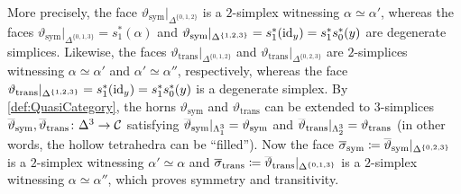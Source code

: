 \begin{numpar}[Compositions.]
	More precisely, the face $\vartheta_\mathrm{sym}|_{\Delta^{\{0,1,2\}}}$ is a $2$-simplex witnessing $\alpha\simeq \alpha'$, whereas the faces $\vartheta_\mathrm{sym}|_{\Delta^{\{0,1,3\}}}=s_1^*(\alpha)$ and $\vartheta_\mathrm{sym}|_{\Delta^{\{1,2,3\}}}=s_1^*(\operatorname{id}_y)=s_1^*s_0^*(y)$ are degenerate simplices. Likewise, the faces $\vartheta_\mathrm{trans}|_{\Delta^{\{0,1,2\}}}$ and $\vartheta_\mathrm{trans}|_{\Delta^{\{0,2,3\}}}$ are $2$-simplices witnessing $\alpha\simeq \alpha'$ and $\alpha'\simeq \alpha''$, respectively, whereas the face $\vartheta_\mathrm{trans}|_{\Delta^{\{1,2,3\}}}=s_1^*(\operatorname{id}_y)=s_1^*s_0^*(y)$ is a degenerate simplex. By \cref{def:QuasiCategory}, the horns $\vartheta_\mathrm{sym}$ and $\vartheta_\mathrm{trans}$ can be extended to $3$-simplices $\ov\vartheta_\mathrm{sym},\ov\vartheta_\mathrm{trans}\colon \Delta^3\rightarrow \Cc$ satisfying $\ov\vartheta_\mathrm{sym}|_{\Lambda_1^3}=\vartheta_\mathrm{sym}$ and $\ov\vartheta_\mathrm{trans}|_{\Lambda_2^3}=\vartheta_\mathrm{trans}$ (in other words, the hollow tetrahedra can be \enquote{filled}). Now the face $\ov\sigma_\mathrm{sym}\coloneqq \ov\vartheta_\mathrm{sym}|_{\Delta^{\{0,2,3\}}}$ is a $2$-simplex witnessing $\alpha'\simeq \alpha$ and $\ov\sigma_\mathrm{trans}\coloneqq \ov\vartheta_\mathrm{trans}|_{\Delta^{\{0,1,3\}}}$ is a $2$-simplex witnessing $\alpha\simeq \alpha''$, which proves symmetry and transitivity.	
	

\end{numpar}
